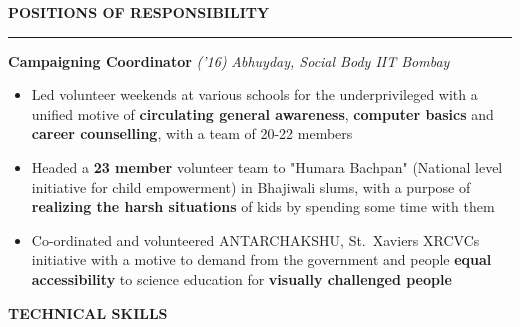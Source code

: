 \documentclass[10 pt]{article}%
\begin{document}
{{{{{{{{{{\begin{flushleft}\bf{\large{POSITIONS OF RESPONSIBILITY}}\end{flushleft}
\vspace{-1.5mm}
\hrule
{\flushleft \textbf {\large{Campaigning Coordinator}} \hfill {{{\em{('16)}}}}
	\vspace{-0.8em}
	{\flushleft \em{Abhuyday, Social Body IIT Bombay}}
	\vspace{-5pt}
	\begin{itemize}[leftmargin=*]
		\setlength\itemsep{1pt}
		\setlength\parskip{1pt}
		\item Led volunteer weekends at various schools for the underprivileged with a unified motive of \textbf{circulating general awareness}, \textbf{computer basics} and \textbf{career counselling}, with a team of 20-22 members
		\item Headed a \textbf{23 member} volunteer team to "Humara Bachpan" (National level initiative for child empowerment) in Bhajiwali slums, with a purpose of \textbf{realizing the harsh situations} of kids by spending some time with them
		\item Co-ordinated and volunteered ANTARCHAKSHU, St.\ Xaviers XRCVCs initiative with a motive to demand from the government and people \textbf{equal accessibility} to science education for \textbf{visually challenged people}
	\end{itemize}
\begin{flushleft}\bf{\large{TECHNICAL SKILLS}}\end{flushleft}
}}}}}}}}}}}
\end{document}
